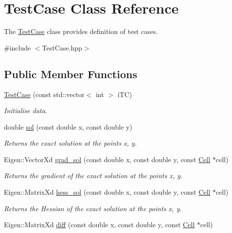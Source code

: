 \hypertarget{classTestCase}{}\section{Test\+Case Class Reference}
\label{classTestCase}


The \hyperlink{classTestCase}{Test\+Case} class provides definition of test cases.  




{\ttfamily \#include $<$Test\+Case.\+hpp$>$}

\subsection*{Public Member Functions}
\begin{DoxyCompactItemize}
\item 
\hyperlink{classTestCase_aa4ad29533416ee515205db87002a1bf1}{Test\+Case} (const std\+::vector$<$ int $>$ i\+TC)
\begin{DoxyCompactList}\small\item\em Initialise data. \end{DoxyCompactList}\item 
double \hyperlink{classTestCase_aede719dac81c460c713d930a379c537e}{sol} (const double x, const double y)
\begin{DoxyCompactList}\small\item\em Returns the exact solution at the points x, y. \end{DoxyCompactList}\item 
Eigen\+::\+Vector\+Xd \hyperlink{classTestCase_a3a498bb6578e46551607ec6ceb164e18}{grad\+\_\+sol} (const double x, const double y, const \hyperlink{classHArDCore2D_1_1Cell}{Cell} $\ast$cell)
\begin{DoxyCompactList}\small\item\em Returns the gradient of the exact solution at the points x, y. \end{DoxyCompactList}\item 
Eigen\+::\+Matrix\+Xd \hyperlink{classTestCase_a9293e0429bb3ce0c3312406405872329}{hess\+\_\+sol} (const double x, const double y, const \hyperlink{classHArDCore2D_1_1Cell}{Cell} $\ast$cell)
\begin{DoxyCompactList}\small\item\em Returns the Hessian of the exact solution at the points x, y. \end{DoxyCompactList}\item 
Eigen\+::\+Matrix\+Xd \hyperlink{classTestCase_a4015f763a8a2979e896766683c6dfbfd}{diff} (const double x, const double y, const \hyperlink{classHArDCore2D_1_1Cell}{Cell} $\ast$cell)

\end{DoxyCompactItemize}
